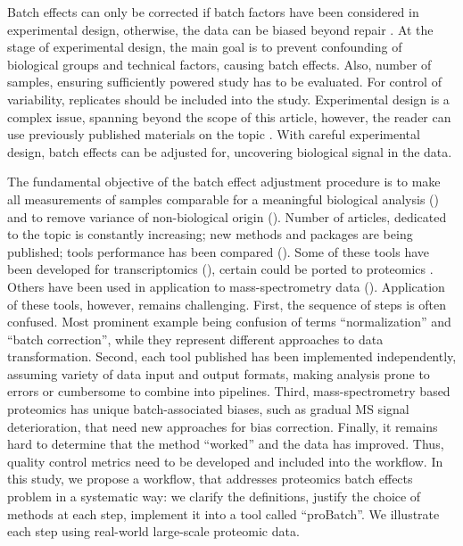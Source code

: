 \documentclass[num-refs]{wiley-article}
\begin{document}
Batch effects can only be corrected if batch factors have been considered in experimental design, otherwise, the data can be biased beyond repair  \cite{Hu2005, Gilad2015}. At the stage of experimental design, the main goal is to prevent confounding of biological groups and technical factors, causing batch effects. Also, number of samples, ensuring sufficiently powered study has to be evaluated. For control of variability, replicates should be included into the study. Experimental design is a complex issue, spanning beyond the scope of this article, however, the reader can use previously published materials on the topic \cite{Oberg2009, Cuklina2020}. With careful experimental design, batch effects can be adjusted for, uncovering biological signal in the data.

The fundamental objective of the batch effect adjustment procedure is to make all measurements of samples comparable for a meaningful biological analysis (\cite{Leek:2010aa}) and to remove variance of non-biological origin (\cite{Bolstad2003}). Number of articles, dedicated to the topic is constantly increasing; new methods and packages are being published; tools performance has been compared (\cite{Luo2010, Chen:2011ac, Dillies:2013aa, Chawade:2014aa}). Some of these tools have been developed for transcriptomics (\cite{Johnson:2007aa, Sims:2008aa, Leek:2007aa, Benito2004, Dillies:2013aa}), certain could be ported to proteomics \cite{Lee:2019aa}. Others have been used in application to mass-spectrometry data (\cite{Karpievitch2012, Chawade:2014aa, Valikangas2018, Gregori2012}). Application of these tools, however, remains challenging. First, the sequence of steps is often confused. Most prominent example being confusion of terms “normalization” and “batch correction”, while they represent different approaches to data transformation. Second, each tool published has been implemented independently, assuming variety of data input  and output formats, making analysis prone to errors or cumbersome to combine into pipelines. Third, mass-spectrometry based proteomics has unique batch-associated biases, such as gradual MS signal deterioration, that need new approaches for bias correction. Finally, it remains hard to determine that the method “worked” and the data has improved. Thus, quality control metrics need to be developed and included into the workflow. In this study, we propose a workflow, that addresses proteomics batch effects problem in a systematic way: we clarify the definitions, justify the choice of methods at each step, implement it into a tool called “proBatch”. We illustrate each step using real-world large-scale proteomic data.
\end{document}

